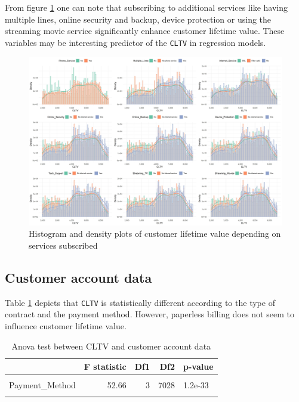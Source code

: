 \documentclass[
]{book}
\begin{document}
From figure \ref{fig:cltvservices} one can note that subscribing to additional services like having multiple lines, online security and backup, device protection or using the streaming movie service significantly enhance customer lifetime value. These variables may be interesting predictor of the \texttt{CLTV} in regression models.

\begin{figure}

{\centering \includegraphics[width=75in]{./imgs/cltv_services_plots} 

}

\caption{Histogram and density plots of customer lifetime value depending on services subscribed}\label{fig:cltvservices}
\end{figure}

\hypertarget{customer-account-data-1}{%
\subsection*{Customer account data}\label{customer-account-data-1}}

Table \ref{tab:aovaccountinfo} depicts that \texttt{CLTV} is statistically different according to the type of contract and the payment method. However, paperless billing does not seem to influence customer lifetime value.

\begin{table}[H]

\caption{\label{tab:aovaccountinfo}Anova test between CLTV and customer account data}
\centering
\begin{tabular}[t]{lrrrl}
\toprule
  & F statistic & Df1 & Df2 & p-value\\
\midrule
\cellcolor{gray!6}{Contract} & \cellcolor{gray!6}{274.28} & \cellcolor{gray!6}{2} & \cellcolor{gray!6}{7029} & \cellcolor{gray!6}{2e-115}\\
Payment\_Method & 52.66 & 3 & 7028 & 1.2e-33\\
\cellcolor{gray!6}{Paperless\_Billing} & \cellcolor{gray!6}{0.77} & \cellcolor{gray!6}{1} & \cellcolor{gray!6}{7030} & \cellcolor{gray!6}{3.8e-01}\\
\bottomrule
\end{tabular}
\end{table}
\end{document}
